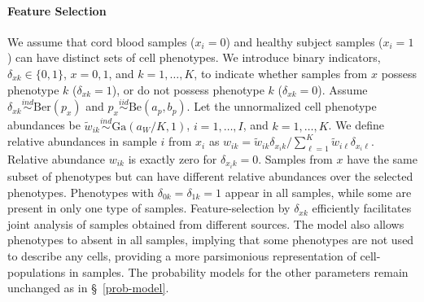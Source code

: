\documentclass[12pt,]{article}
\newcommand{\iid}{\overset{iid}{\sim}}
\newcommand{\ind}{\overset{ind}{\sim}}
\def\G{\text{Ga}}
\def\Ber{\text{Ber}}
\def\Be{\text{Be}}
\begin{document}
\paragraph*{Feature Selection} We assume that cord blood samples ($x_i=0$) and
healthy subject samples ($x_i=1$) can have distinct sets of cell phenotypes.
We introduce binary indicators, $\delta_{xk}\in \{0, 1\}$, $x=0,1$, and
$k=1,\ldots, K$, to indicate whether samples from $x$ possess phenotype $k$
($\delta_{xk}=1$), or do not possess phenotype $k$ ($\delta_{xk}=0$). Assume
$\delta_{xk} \ind \Ber(p_{x})$ and $p_x \iid \Be(a_p, b_p)$.  Let the unnormalized
cell phenotype abundances be $\tilde w_{ik} \ind \G(a_W/K, 1)$, $i=1, \ldots, I$,
and $k=1, \ldots, K$. We define relative abundances in sample $i$ from
$x_i$ as 
$
w_{ik} =\tilde w_{ik} \delta_{x_i k}/\sum_{\ell=1}^K\tilde w_{i\ell} \delta_{x_i \ell}.
$
Relative abundance $w_{ik}$ is exactly zero for $\delta_{x_ik}=0$. Samples
from $x$ have the same subset of phenotypes but can have different relative
abundances over the selected phenotypes. Phenotypes with
$\delta_{0k}=\delta_{1k}=1$ appear in all samples, while some are present in only
one type of samples. Feature-selection by $\delta_{xk}$ efficiently facilitates
joint analysis of samples obtained from different sources. The model also
allows phenotypes to absent in all samples, implying that some phenotypes are not
used to describe any cells, providing a more parsimonious representation of 
cell-populations in samples. The probability models for the other parameters
remain unchanged as in \S~\ref{prob-model}.  
\end{document}
